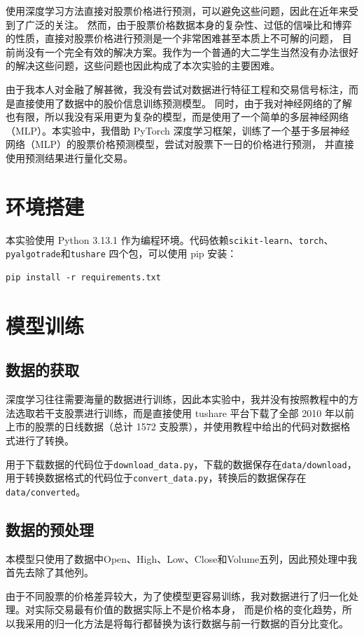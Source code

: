 \documentclass[final,5p,times,twocolumn,authoryear]{elsarticle}
\begin{document}
使用深度学习方法直接对股票价格进行预测，可以避免这些问题，因此在近年来受到了广泛的关注。
然而，由于股票价格数据本身的复杂性、过低的信噪比和博弈的性质，直接对股票价格进行预测是一个非常困难甚至本质上不可解的问题，
目前尚没有一个完全有效的解决方案。我作为一个普通的大二学生当然没有办法很好的解决这些问题，这些问题也因此构成了本次实验的主要困难。

由于我本人对金融了解甚微，我没有尝试对数据进行特征工程和交易信号标注，而是直接使用了数据中的股价信息训练预测模型。
同时，由于我对神经网络的了解也有限，所以我没有采用更为复杂的模型，而是使用了一个简单的多层神经网络（MLP）。本实验中，我借助
PyTorch 深度学习框架，训练了一个基于多层神经网络（MLP）的股票价格预测模型，尝试对股票下一日的价格进行预测，
并直接使用预测结果进行量化交易。

\section{环境搭建}
本实验使用 Python 3.13.1 作为编程环境。代码依赖\texttt{scikit-learn}、\texttt{torch}、\texttt{pyalgotrade}和\texttt{tushare}
四个包，可以使用 pip 安装：
\begin{verbatim}
pip install -r requirements.txt
\end{verbatim}

\section{模型训练}

\subsection{数据的获取}
深度学习往往需要海量的数据进行训练，因此本实验中，我并没有按照教程中的方法选取若干支股票进行训练，而是直接使用
tushare 平台下载了全部 2010 年以前上市的股票的日线数据（总计 1572 支股票），并使用教程中给出的代码对数据格式进行了转换。

用于下载数据的代码位于\texttt{download\_data.py}，下载的数据保存在\texttt{data/download}，
用于转换数据格式的代码位于\texttt{convert\_data.py}，转换后的数据保存在\texttt{data/converted}。

\subsection{数据的预处理}
本模型只使用了数据中Open、High、Low、Close和Volume五列，因此预处理中我首先去除了其他列。

由于不同股票的价格差异较大，为了使模型更容易训练，我对数据进行了归一化处理。对实际交易最有价值的数据实际上不是价格本身，
而是价格的变化趋势，所以我采用的归一化方法是将每行都替换为该行数据与前一行数据的百分比变化。
\end{document}
